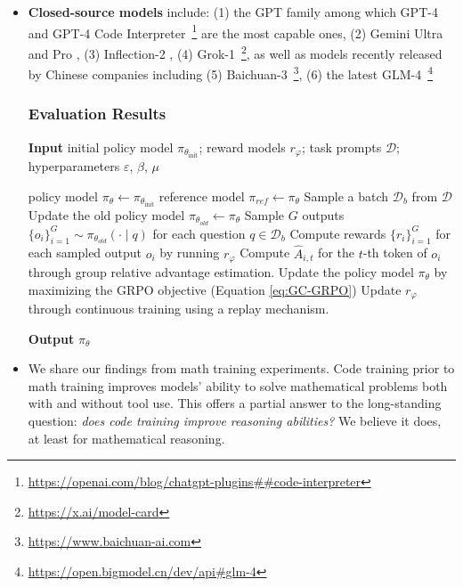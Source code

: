 \begin{itemize}[topsep=0pt]
    \item \textbf{Closed-source models} include: (1) the GPT family among which GPT-4 \citep{gpt4} and GPT-4 Code Interpreter~\footnote{\url{https://openai.com/blog/chatgpt-plugins\#\#code-interpreter}} are the most capable ones, (2) Gemini Ultra and Pro \citep{gemini}, (3) Inflection-2 \citep{inflection-2}, (4) Grok-1~\footnote{\url{https://x.ai/model-card}},
    as well as models recently released by Chinese companies including (5) Baichuan-3~\footnote{\url{https://www.baichuan-ai.com}},
    (6) the latest GLM-4~\footnote{\url{https://open.bigmodel.cn/dev/api\#glm-4}}

\subsubsection{Evaluation Results}

\begin{algorithm}[t]
  \small
  \caption{Iterative Group Relative Policy Optimization}
  \textbf{Input} initial policy model $\pi_{\theta_{\text{init}}}$; reward models $r_\varphi$; task prompts $\mathcal{D}$; 
  hyperparameters $\varepsilon$, $\beta$, $\mu$
  \begin{algorithmic}[1]
    \State policy model $\pi_\theta \leftarrow \pi_{\theta_{\text{init}}}$
       \State reference model $\pi_{ref} \leftarrow \pi_{\theta}$
      \State Sample a batch $\mathcal{D}_b$ from $\mathcal{D}$
      \State Update the old policy model $\pi_{\theta_{old}} \leftarrow \pi_{\theta}$ 
      \State Sample $G$ outputs $\{o_i\}_{i=1}^G \sim \pi_{\theta_{old}} (\cdot \mid q) $ for each question $q \in \mathcal{D}_b$
      \State Compute rewards $\{r_i\}_{i=1}^{G}$ for each sampled output $o_i$ by running $r_{\varphi}$ 
      \State Compute $\hat{A}_{i,t}$ for the $t$-th token of $o_i$ through group relative advantage estimation.
        \State Update the policy model $\pi_{\theta}$ by maximizing the GRPO objective (Equation \ref{eq:GC-GRPO})
      \EndFor
    \EndFor \State Update $r_\varphi$ through continuous training using a replay mechanism. 
    \EndFor 
  \end{algorithmic}
  \textbf{Output} $\pi_\theta$
  \label{alg:iter-grpo}
\end{algorithm}

    \item We share our findings from math training experiments. Code training prior to math training improves models' ability to solve mathematical problems both with and without tool use. This offers a partial answer to the long-standing question: \textit{does code training improve reasoning abilities?} We believe it does, at least for mathematical reasoning.


\end{itemize}
